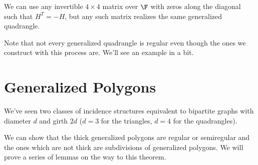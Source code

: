 We can use any invertible $4\times 4$ matrix over $\F$ with zeros along the diagonal such that $H^T=-H$, but any such matrix realizes the same generalized quadrangle.

Note that not every generalized quadrangle is regular even though the ones we construct with this process are.  We'll see an example in a bit.

\section*{Generalized Polygons}
We've seen two classes of incidence structures equivalent to bipartite graphs with diameter $d$ and girth $2d$ ($d=3$ for the triangles, $d=4$ for the quadrangles).  



We can show that the thick generalized polygons are regular or semiregular and the ones which are not thick are subdivisions of generalized polygons.  We will prove a series of lemmas on the way to this theorem.

